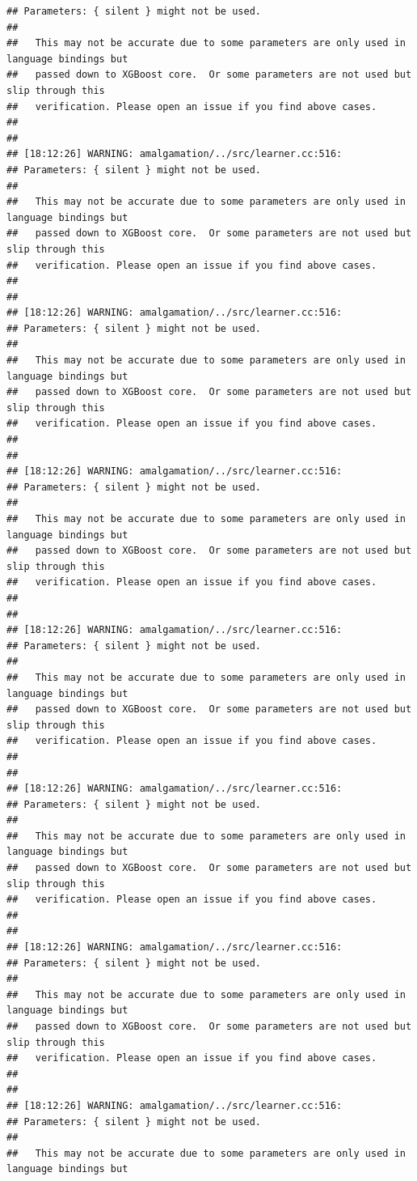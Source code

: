 \documentclass[AMS,STIX2COL]{WileyNJD-v2}\usepackage[]{graphicx}\usepackage[]{color}
\makeatletter
\newenvironment{kframe}{%
 \def\at@end@of@kframe{}%
 \ifinner\ifhmode%
  \def\at@end@of@kframe{\end{minipage}}%
  \begin{minipage}{\columnwidth}%
 \fi\fi%
 \def\FrameCommand##1{\hskip\@totalleftmargin \hskip-\fboxsep
 \colorbox{shadecolor}{##1}\hskip-\fboxsep
     \hskip-\linewidth \hskip-\@totalleftmargin \hskip\columnwidth}%
 \MakeFramed {\advance\hsize-\width
   \@totalleftmargin\z@ \linewidth\hsize
   \@setminipage}}%
 {\par\unskip\endMakeFramed%
 \at@end@of@kframe}
\newenvironment{knitrout}{}{} %
\makeatother
\begin{document}
\begin{knitrout}
\begin{kframe}
\begin{verbatim}
## Parameters: { silent } might not be used.
## 
##   This may not be accurate due to some parameters are only used in language bindings but
##   passed down to XGBoost core.  Or some parameters are not used but slip through this
##   verification. Please open an issue if you find above cases.
## 
## 
## [18:12:26] WARNING: amalgamation/../src/learner.cc:516: 
## Parameters: { silent } might not be used.
## 
##   This may not be accurate due to some parameters are only used in language bindings but
##   passed down to XGBoost core.  Or some parameters are not used but slip through this
##   verification. Please open an issue if you find above cases.
## 
## 
## [18:12:26] WARNING: amalgamation/../src/learner.cc:516: 
## Parameters: { silent } might not be used.
## 
##   This may not be accurate due to some parameters are only used in language bindings but
##   passed down to XGBoost core.  Or some parameters are not used but slip through this
##   verification. Please open an issue if you find above cases.
## 
## 
## [18:12:26] WARNING: amalgamation/../src/learner.cc:516: 
## Parameters: { silent } might not be used.
## 
##   This may not be accurate due to some parameters are only used in language bindings but
##   passed down to XGBoost core.  Or some parameters are not used but slip through this
##   verification. Please open an issue if you find above cases.
## 
## 
## [18:12:26] WARNING: amalgamation/../src/learner.cc:516: 
## Parameters: { silent } might not be used.
## 
##   This may not be accurate due to some parameters are only used in language bindings but
##   passed down to XGBoost core.  Or some parameters are not used but slip through this
##   verification. Please open an issue if you find above cases.
## 
## 
## [18:12:26] WARNING: amalgamation/../src/learner.cc:516: 
## Parameters: { silent } might not be used.
## 
##   This may not be accurate due to some parameters are only used in language bindings but
##   passed down to XGBoost core.  Or some parameters are not used but slip through this
##   verification. Please open an issue if you find above cases.
## 
## 
## [18:12:26] WARNING: amalgamation/../src/learner.cc:516: 
## Parameters: { silent } might not be used.
## 
##   This may not be accurate due to some parameters are only used in language bindings but
##   passed down to XGBoost core.  Or some parameters are not used but slip through this
##   verification. Please open an issue if you find above cases.
## 
## 
## [18:12:26] WARNING: amalgamation/../src/learner.cc:516: 
## Parameters: { silent } might not be used.
## 
##   This may not be accurate due to some parameters are only used in language bindings but

\end{verbatim}
\end{kframe}
\end{knitrout}
\end{document}
